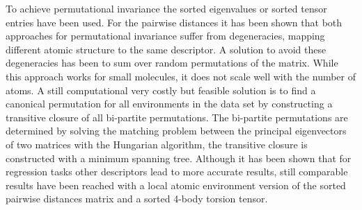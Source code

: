 To achieve permutational invariance the sorted eigenvalues\cite{rupp2012fast, sadeghi2013metrics, zhu2016fingerprint} or sorted tensor entries\cite{hansen2015machine, barker2016localized, huang2016communication} have been used.
For the pairwise distances it has been shown that both approaches for permutational invariance suffer from degeneracies, mapping different atomic structure to the same descriptor\cite{moussa2012comment}.
A solution to avoid these degeneracies has been to sum over random permutations of the matrix\cite{montavon2012learning, montavon2013machine, sadeghi2013metrics}.
While this approach works for small molecules, it does not scale well with the number of atoms.
A still computational very costly but feasible solution is to find a canonical permutation for all environments in the data set by constructing a transitive closure of all bi-partite permutations\cite{chmiela2018towards}. The bi-partite permutations are determined by solving the matching problem between the principal eigenvectors of two matrices with the Hungarian algorithm\cite{kuhn1955hungarian}, the transitive closure is constructed with a minimum spanning tree.
Although it has been shown that for regression tasks other descriptors lead to more accurate results\cite{de2016comparing, bartok2017machine, jager2018machine}, still comparable results have been reached with a local atomic environment version of the sorted pairwise distances matrix\cite{barker2016localized} and a sorted 4-body torsion tensor\cite{huang2016communication}.

